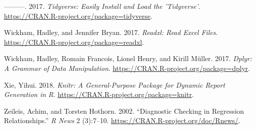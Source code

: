 \documentclass[11,]{article}
\begin{document}
\leavevmode\hypertarget{ref-tidyverse}{}%
---------. 2017. \emph{Tidyverse: Easily Install and Load the
'Tidyverse'}. \url{https://CRAN.R-project.org/package=tidyverse}.

\leavevmode\hypertarget{ref-readxl}{}%
Wickham, Hadley, and Jennifer Bryan. 2017. \emph{Readxl: Read Excel
Files}. \url{https://CRAN.R-project.org/package=readxl}.

\leavevmode\hypertarget{ref-dplyr}{}%
Wickham, Hadley, Romain Francois, Lionel Henry, and Kirill Müller. 2017.
\emph{Dplyr: A Grammar of Data Manipulation}.
\url{https://CRAN.R-project.org/package=dplyr}.

\leavevmode\hypertarget{ref-R-knitr}{}%
Xie, Yihui. 2018. \emph{Knitr: A General-Purpose Package for Dynamic
Report Generation in R}. \url{https://CRAN.R-project.org/package=knitr}.

\leavevmode\hypertarget{ref-lmtest}{}%
Zeileis, Achim, and Torsten Hothorn. 2002. ``Diagnostic Checking in
Regression Relationships.'' \emph{R News} 2 (3):7--10.
\url{https://CRAN.R-project.org/doc/Rnews/}.
\end{document}
